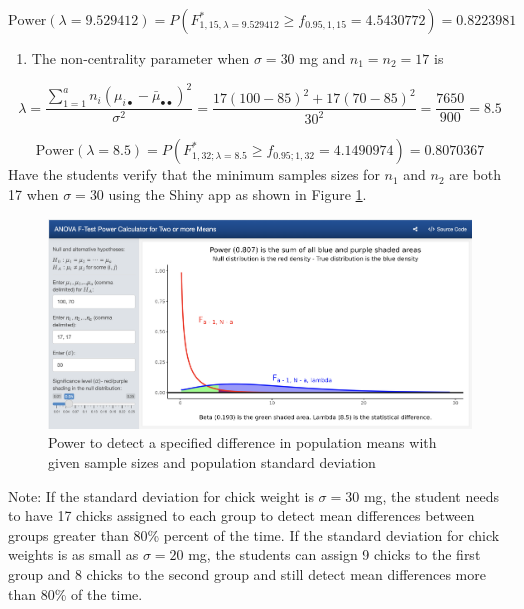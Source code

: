 \documentclass[
]{article}
\providecommand{\tightlist}{%
  \setlength{\itemsep}{0pt}\setlength{\parskip}{0pt}}
\begin{document}
\[\text{Power}(\lambda = 9.529412) = P(F^*_{1, 15, \lambda = 9.529412} \geq f_{0.95, 1, 15} = 4.5430772) = 0.8223981\]

\begin{enumerate}
\def\labelenumi{\alph{enumi})}
\setcounter{enumi}{5}
\tightlist
\item
  The non-centrality parameter when \(\sigma = 30\) mg and \(n_1 = n_2 = 17\) is
\end{enumerate}

\begin{equation*}
\lambda = \frac{\sum_{1 = 1}^an_i(\mu_{i\bullet} - \bar{\mu}_{\bullet\bullet})^2}{\sigma^2} = \frac{17(100 - 85)^2 + 17(70 - 85)^2}{30^2} = \frac{7650}{900} = 8.5
\end{equation*}

\[\text{Power}(\lambda = 8.5) = P(F^*_{1, 32; \lambda = 8.5} \geq f_{0.95; 1, 32} = 4.1490974) = 0.8070367\]
Have the students verify that the minimum samples sizes for \(n_1\) and \(n_2\) are both 17 when \(\sigma = 30\) using the Shiny app as shown in Figure \ref{fig:power3}.

\begin{figure}

{\centering \includegraphics[width=7.35in]{./pics/fig-power3b} 

}

\caption{Power to detect a specified difference in population means with given sample sizes and population standard deviation}\label{fig:power3}
\end{figure}

Note: If the standard deviation for chick weight is \(\sigma = 30\) mg, the student needs to have 17 chicks assigned to each group to detect mean differences between groups greater than 80\% percent of the time. If the standard deviation for chick weights is as small as \(\sigma = 20\) mg, the students can assign 9 chicks to the first group and 8 chicks to the second group and still detect mean differences more than 80\% of the time.
\end{document}
